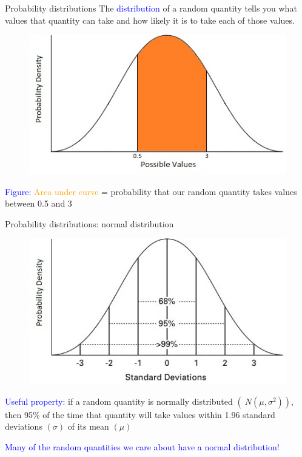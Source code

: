 \documentclass[10pt,t]{beamer}
\begin{document}
\begin{frame}{Probability distributions}
The \textcolor{blue}{distribution} of a random quantity tells you what values that quantity can take and how likely it is to take each of those values.

\begin{figure}
	\centering \includegraphics[scale=0.5]{Normal-density.jpg}
\end{figure}

\textcolor{blue}{Figure:} \textcolor{orange}{Area under curve} = probability that our random quantity takes values between 0.5 and 3

\end{frame}

\begin{frame}{Probability distributions: normal distribution}

\begin{figure}
	\centering \includegraphics[scale=0.5]{Normal.jpg}
\end{figure}

\textcolor{blue}{Useful property:} if a random quantity is normally distributed $(~N(\mu, \sigma^2))$, then 95\% of the time that quantity will take values within 1.96 standard deviations $(\sigma)$ of its mean $(\mu)$

\vspace{0.3cm}

\small \textcolor{blue}{Many of the random quantities we care about have a normal distribution!} 
\end{frame}
\end{document}
